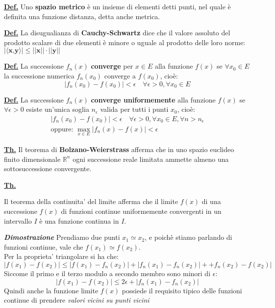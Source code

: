 \documentclass[a4paper,10pt]{article} %
\renewcommand{\b}[1]{%
    {\textbf{#1}}}
\newcommand{\ldef}[1]{%
    {\smallbreak\par\normalsize\textbf{\underline{Def.}} {#1} \smallbreak}}
\newcommand{\ltheorem}[1]{%
    {\smallbreak\par\normalsize\textbf{\underline{Th.}} {#1} \smallbreak\par}}
\newcommand{\ldim}[1]{%
    {\smallbreak\par\scriptsize\emph{\textbf{Dimostrazione}} {#1} \par}}
\begin{document}
\begin{multicols}{2}
\ldef{Uno \b{spazio metrico} \`{e} un insieme di elementi detti punti, nel quale \`{e} definita una funzione distanza, detta anche metrica.
}

\ldef{La disugualianza di \b{Cauchy-Schwartz} dice che il valore assoluto del prodotto scalare di due elementi \`{e} minore o uguale al prodotto delle loro norme:
    $|\langle \b{x,y} \rangle| \leq ||\b{x}|| \cdot ||\b{y}||$
}



\ldef{La successione ${f_n(x)}$ \b{converge} per $x \in E$ alla funzione $f(x)$ se $\forall x_0 \in E$ la successione numerica ${f_n(x_0)}$ converge a $f(x_0)$, cio\`{e}:
    \begin{equation}
        |f_n(x_0) - f(x_0)| < \epsilon \quad \forall \epsilon > 0, \forall x_0 \in E
    \end{equation}
}

\ldef{La successione ${f_n(x)}$\b{converge uniformemente} alla funzione $f(x)$ se $\forall \epsilon > 0$ esiste un'unica soglia $n_\epsilon$ valida per tutti i punti $x_0$, cio\`{e}:
    \begin{gather}
        |f_n(x_0) - f(x_0)| < \epsilon \quad \forall \epsilon > 0 , \forall x_0 \in E, \forall n > n_\epsilon \\
         \text{oppure: } \max_{x\in E} |f_n(x) - f(x)| < \epsilon
    \end{gather}
}

\ltheorem{Il teorema di \b{Bolzano-Weierstrass} afferma che in uno spazio euclideo finito dimensionale $\mathbb{R}^n$ ogni successione reale limitata ammette almeno una sottosuccessione convergente.
}

\ltheorem{Il teorema della continuita' del limite afferma che il limite $f(x)$ di una successione ${f(x)}$ di funzioni continue uniformemente convergenti in un intervallo $I$ \`{e} una funzione continua in $I$.
    \ldim{
        Prendiamo due punti $x_1 \simeq x_2$, e poich\`{e} stiamo parlando di funzioni continue, vale che $f(x_1) \simeq f(x_2)$. \\
        Per la proprieta' triangolare si ha che:
        $$|f(x_1) - f(x_2)| \leq |f(x_1) - f_n(x_2)| + |f_n(x_1) - f_n(x_2)| + +f_n(x_2) - f(x_2)|$$
        Siccome il primo e il terzo modulo a secondo membro sono minori di $\epsilon$:
        $$|f(x_1) - f(x_2)| \leq 2\epsilon + |f_n(x_1) - f_n(x_2)|$$
        Quindi anche la funzione limite $f(x)$ possiede il requisito tipico delle funzioni continue di prendere \emph{valori vicini su punti vicini}
    }
}


\end{multicols}
\end{document}
